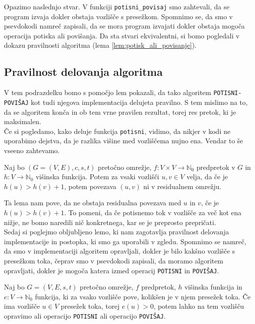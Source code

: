 \documentclass[mat1]{fmfdelo}
\newcommand{\N}{\mathbb N}
\begin{document}
Opazimo naslednjo stvar. V funkciji \texttt{potisni\_povisaj} smo zahtevali, da se program izvaja dokler obstaja vozlišče s presežkom. Spomnimo se, da smo v psevdokodi namreč zapisali, da se mora program izvajati dokler obstaja mogoča operacija potiska ali povišanja. Da sta stvari ekvivalentni, si bomo pogledali v dokazu pravilnosti algoritma (lema \ref{lem:potisk_ali_povisanje}).



\subsection{Pravilnost delovanja algoritma}

V tem podrazdelku bomo s pomočjo lem pokazali, da tako algoritem \texttt{POTISNI-POVIŠAJ} kot tudi njegova implementacija delujeta pravilno. S tem mislimo na to, da se algoritem konča in ob tem vrne pravilen rezultat, torej res pretok, ki je maksimalen.\\

Če si pogledamo, kako deluje funkcija \texttt{potisni}, vidimo, da nikjer v kodi ne uporabimo dejstva, da je razlika višine med vozliščema nujno ena. Vendar to še vseeno zahtevamo.

\begin{lema}
Naj bo $(G = (V,E), c, s, t)$ pretočno omrežje, $f\colon V \times V \rightarrow \N_0$ predpretok v $G$ in $h\colon V \rightarrow \N_0$ višinska funkcija. Potem za vsaki vozlišči $u,v \in V$ velja, da če je $h(u) > h(v) + 1$, potem povezava $(u,v)$ ni v residualnem omrežju.
\end{lema}

Ta lema nam pove, da ne obstaja residualna povezava med $u$ in $v$, če je $h(u) > h(v) + 1$. To pomeni, da če potisnemo tok v vozlišče za več kot ena nižje, ne bomo naredili nič konkretnega, kar se je preprosto prepričati.\\


Sedaj si poglejmo obljubljeno lemo, ki nam zagotavlja pravilnost delovanja implementacije in postopka, ki smo ga uporabili v zgledu. Spomnimo se namreč, da smo v implementaciji algoritem opravljali, dokler je bilo kakšno vozlišče s presežkom toka, čeprav smo v psevdokodi zapisali, da moramo algoritem opravljati, dokler je mogoča katera izmed operacij \texttt{POTISNI} in \texttt{POVIŠAJ}.

\begin{lema}\label{lem:potisk_ali_povisanje}
Naj bo $G=(V,E,s,t)$ pretočno omrežje, $f$ predpretok, $h$ višinska funkcija in $e\colon V \rightarrow \N_0$ funkcija, ki za vsako vozlišče pove, kolikšen je v njem presežek toka. Če ima vozlišče $u\in V$ presežek toka, torej $e(u) > 0$, potem lahko na tem vozlišču opravimo ali operacijo \texttt{POTISNI} ali operacijo \texttt{POVIŠAJ}.
\end{lema}
\end{document}
